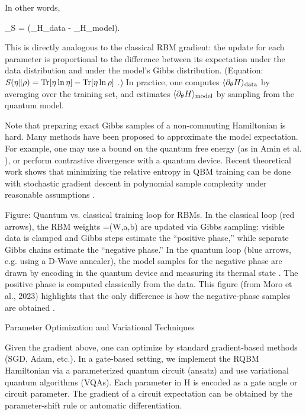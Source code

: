In other words,

\nabla_\theta S \;=\; \beta\Bigl(\langle \partial_\theta H\rangle_{\rm data} \;-\; \langle \partial_\theta H\rangle_{\rm model}\Bigr).

This is directly analogous to the classical RBM gradient: the update for each parameter is proportional to the difference between its expectation under the data distribution and under the model’s Gibbs distribution.  (Equation: $S(\eta\Vert\rho)={\rm Tr}[\eta\ln\eta]-{\rm Tr}[\eta\ln\rho]$ .)  In practice, one computes $\langle \partial_\theta H\rangle_{\rm data}$ by averaging over the training set, and estimates $\langle \partial_\theta H\rangle_{\rm model}$ by sampling from the quantum model.



Note that preparing exact Gibbs samples of a non-commuting Hamiltonian is hard.  Many methods have been proposed to approximate the model expectation.  For example, one may use a bound on the quantum free energy (as in Amin et al. ), or perform contrastive divergence with a quantum device.  Recent theoretical work shows that minimizing the relative entropy in QBM training can be done with stochastic gradient descent in polynomial sample complexity under reasonable assumptions .



Figure: Quantum vs. classical training loop for RBMs.  In the classical loop (red arrows), the RBM weights \Theta=(W,a,b) are updated via Gibbs sampling: visible data is clamped and Gibbs steps estimate the “positive phase,” while separate Gibbs chains estimate the “negative phase.”  In the quantum loop (blue arrows, e.g. using a D-Wave annealer), the model samples for the negative phase are drawn by encoding \Theta in the quantum device and measuring its thermal state .  The positive phase is computed classically from the data.  This figure (from Moro et al., 2023) highlights that the only difference is how the negative-phase samples are obtained .





Parameter Optimization and Variational Techniques





Given the gradient above, one can optimize \theta by standard gradient-based methods (SGD, Adam, etc.).  In a gate-based setting, we implement the RQBM Hamiltonian via a parameterized quantum circuit (ansatz) and use variational quantum algorithms (VQAs).  Each parameter in H is encoded as a gate angle or circuit parameter.  The gradient of a circuit expectation can be obtained by the parameter-shift rule or automatic differentiation.



